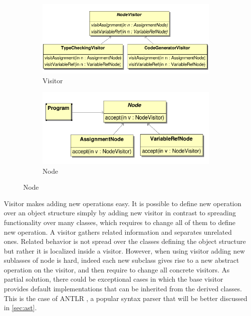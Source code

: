 \begin{figure}[h]
\centering
\begin{subfigure}{.48\textwidth}
\includegraphics[width=\textwidth]{Figs/visitor.PNG}
\caption{Visitor}
\label{fig:visitor}
\end{subfigure}
\begin{subfigure}{.48\textwidth}
\includegraphics[width=\textwidth]{Figs/nodeVisitor.PNG}
\caption{Node}
\label{fig:nodeVisitor}
\end{subfigure}
\end{figure}

Visitor makes adding new operations easy. It is possible to define new operation over an object structure simply by adding new visitor in contrast to spreading functionality over many classes, which requires to change all of them to define new operation. A visitor gathers related information and separates unrelated ones. Related behavior is not spread over the classes defining the object structure but rather it is localized inside a visitor. However, when using visitor adding new sublasses of node is hard, indeed each new subclass gives rise to a new abstract operation on the visitor, and then require to change all concrete visitors. As partial solution, there could be exceptional cases in which the base visitor provides default implementations that can be inherited from the derived classes. This is the case of ANTLR \citep{antlr}, a popular syntax parser that will be better discussed in \ref{sec:ast}.

